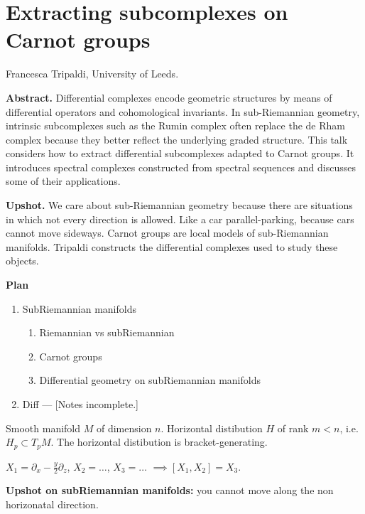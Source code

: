 \section{Extracting subcomplexes on
Carnot groups}
\label{section-subcomplexes-carnot-groups}

\medskip\noindent
Francesca Tripaldi,
University of Leeds.

\medskip\noindent
{\bf Abstract.}
Differential complexes encode geometric
structures by means of differential
operators and cohomological invariants.
In sub-Riemannian geometry, intrinsic
subcomplexes such as the Rumin complex
often replace the de Rham complex because
they better reflect the underlying graded
structure. This talk considers how to
extract differential subcomplexes adapted
to Carnot groups. It introduces spectral
complexes constructed from spectral
sequences and discusses some of their
applications.

\medskip\noindent
{\bf Upshot.} We care about
sub-Riemannian geometry because there
are situations in which not every direction
is allowed. Like a car parallel-parking, 
because cars cannot move sideways.
Carnot groups are local models of
sub-Riemannian manifolds.
Tripaldi constructs the differential
complexes used to study these objects.

\medskip\noindent
{\bf Plan}
\begin{enumerate}
\item SubRiemannian manifolds
\begin{enumerate}
\item Riemannian vs subRiemannian
\item Carnot groups
\item Differential geometry on subRiemannian
manifolds
\end{enumerate}
\item Diff --- [Notes incomplete.]
\end{enumerate}

\noindent
Smooth manifold $M$ of dimension $n$.
Horizontal distibution $H$ of rank
$m<n$, i.e. $H_p \subset T_pM$.
The horizontal distibution is
bracket-generating.

\begin{example}
\label{example-heisenberg-subbundle}
$X_1=\partial_x - \frac{y}{2}\partial_z$,
$X_2=…$, $X_3=…$ $\implies [X_1,X_2]=X_3$.
\end{example}

\noindent
{\bf Upshot on subRiemannian manifolds:}
 you cannot move along the non
horizonatal direction.


